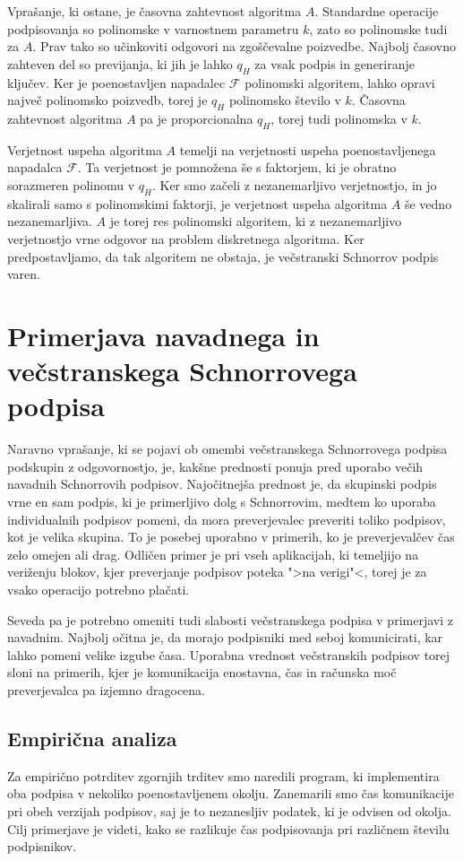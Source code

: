 \documentclass[isrm2, tisk]{fmfdelo}
\begin{document}
Vprašanje, ki ostane, je časovna zahtevnost algoritma $A$. Standardne operacije podpisovanja
so polinomske v varnostnem parametru $k$, zato so polinomske tudi za $A$. Prav tako so učinkoviti
odgovori na zgoščevalne poizvedbe. Najbolj časovno zahteven del so previjanja, ki jih je lahko $q_H$
za vsak podpis in generiranje ključev. Ker je poenostavljen napadalec $\mathcal{F}$ polinomski algoritem,
lahko opravi največ polinomsko poizvedb, torej je $q_H$ polinomsko število v $k$. Časovna zahtevnost
algoritma $A$ pa je proporcionalna $q_H$, torej tudi polinomska v $k$.

Verjetnost uspeha algoritma $A$ temelji na verjetnosti uspeha poenostavljenega napadalca $\mathcal{F}$.
Ta verjetnost je pomnožena še s faktorjem, ki je obratno sorazmeren polinomu v $q_H$. Ker smo
začeli z nezanemarljivo verjetnostjo, in jo skalirali samo s polinomskimi faktorji, je verjetnost
uspeha algoritma $A$ še vedno nezanemarljiva. $A$ je torej res polinomski algoritem, ki z
nezanemarljivo verjetnostjo vrne odgovor na problem diskretnega algoritma. Ker predpostavljamo, da
tak algoritem ne obstaja, je večstranski Schnorrov podpis varen.

\section{Primerjava navadnega in večstranskega Schnorrovega podpisa}
\label{sec:primerjava}
Naravno vprašanje, ki se pojavi ob omembi večstranskega Schnorrovega podpisa podskupin z odgovornostjo,
je, kakšne prednosti ponuja pred uporabo večih navadnih Schnorrovih podpisov. Najočitnejša prednost
je, da skupinski podpis vrne en sam podpis, ki je primerljivo dolg s Schnorrovim, medtem ko uporaba
individualnih podpisov pomeni, da mora preverjevalec preveriti toliko podpisov, kot je velika
skupina. To je posebej uporabno v primerih, ko je preverjevalčev čas zelo omejen ali drag. Odličen
primer je pri vseh aplikacijah, ki temeljijo na veriženju blokov, kjer preverjanje podpisov poteka
">na verigi"<, torej je za vsako operacijo potrebno plačati.

Seveda pa je potrebno omeniti tudi slabosti večstranskega podpisa v primerjavi z navadnim. Najbolj
očitna je, da morajo podpisniki med seboj komunicirati, kar lahko pomeni velike izgube časa. Uporabna
vrednost večstranskih podpisov torej sloni na primerih, kjer je komunikacija enostavna, čas in
računska moč preverjevalca pa izjemno dragocena.

\subsection{Empirična analiza}
Za empirično potrditev zgornjih trditev smo naredili program, ki implementira oba podpisa v nekoliko
poenostavljenem okolju. Zanemarili smo čas komunikacije pri obeh verzijah podpisov, saj je to nezanesljiv
podatek, ki je odvisen od okolja. Cilj primerjave je videti, kako se razlikuje čas podpisovanja
pri različnem številu podpisnikov.
\end{document}
